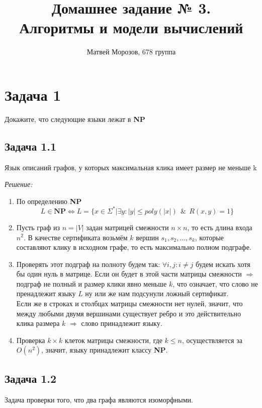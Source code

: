 \documentclass[12pt]{article}
\begin{document}
	\author{Матвей Морозов, 678 группа}
	\title{Домашнее задание № 3.\\ Алгоритмы и модели вычислений}
	\maketitle
	
\section* {Задача 1}
Докажите, что следующие языки лежат в \textbf{NP}
\subsection* {Задача 1.1}
Язык описаний графов, у которых максимальная клика имеет размер не меньше k

{\itshape Решение:}
\\
\begin{enumerate}
	\item По определению \textbf{NP}
	\[L \in \textbf{NP} \Leftrightarrow L = \{x \in \Sigma^* | \exists y: |y| \le poly (|x|) \ \ \& \ \ R(x,y) = 1\}\]
	\item Пусть граф из $n = |V|$ задан матрицей смежности $n \times n$, то есть длина входа $n^2$. В качестве сертификата возьмём $k$ вершин $s_1, s_2, \dots, s_k$, которые составляют клику в исходном графе, то есть максимально полном подграфе.
	\item Проверять этот подграф на полноту будем так: $\forall i,j : i \not= j$ будем искать хотя бы один нуль в матрице. Если он будет в этой части матрицы смежности $\Rightarrow$ подграф не полный и размер клики явно меньше $k$, что означает, что слово не пренадлежит языку $L$ ну или же нам подсунули ложный сертификат. \\
	
	Если же в строках и столбцах матрицы смежности нет нулей, значит, что между любыми двумя вершинами существует ребро и это действительно клика размера $k$ $\Rightarrow$ слово принадлежит языку.
	
	\item Проверка $k \times k$ клеток матрицы смежности, где $k \le n$, осуществляется за $O(n^2)$, значит, языку принадлежит классу \textbf{NP}.
\end{enumerate}
\subsection* {Задача 1.2}
Задача проверки того, что два графа являются изоморфными.
\end{document}
